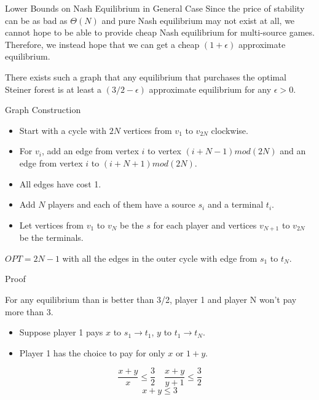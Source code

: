 \documentclass[11pt,aspectratio=169]{beamer}
\begin{document}
\begin{frame}{Lower Bounds on Nash Equilibrium in General Case}
    Since the price of stability can be as bad as $\Theta(N)$ and pure Nash equilibrium may not exist at all, we cannot hope to be able to provide cheap Nash equilibrium for multi-source games.\\
    Therefore, we instead hope that we can get a cheap $(1+\epsilon)$ approximate equilibrium.\\
    \begin{theorem}
        There exists such a graph that any equilibrium that purchases the optimal Steiner forest is at least a $(3/2-\epsilon)$ approximate equilibrium for any $\epsilon > 0$.
    \end{theorem}
\end{frame}

\begin{frame}{Graph Construction }

    \begin{itemize}
        \item Start with a cycle with $2N$ vertices from $v_1 \text{ to } v_{2N}$ clockwise. 
        \item For $v_i$, add an edge from vertex $i$ to vertex $(i+N-1)mod (2N)$ and an edge from vertex $i$ to $(i+N+1)mod (2N)$.
        \item All edges have cost 1. 
        \item Add $N$ players and each of them have a source $s_i$ and a terminal $t_i$. 
        \item Let vertices from $v_1$ to $v_N$ be the $s$ for each player and vertices $v_{N+1}$ to $v_{2N}$ be the terminals.
    \end{itemize}
    $OPT = 2N-1$ with all the edges in the outer cycle with edge from $s_1$ to $t_N$. 
\end{frame}

\begin{frame}{Proof}
   
    \begin{lemma}
        For any equilibrium than is better than 3/2, player 1 and player N won't pay more than 3. 
    \end{lemma}
    \begin{itemize}
        \item Suppose player 1 pays $x$ to $s_1 \rightarrow t_1$, $y$ to $t_1 \rightarrow t_N$. 
        \item Player 1 has the choice to pay for only $x$ or $1+y$. 
    \end{itemize}
    \vspace{10pt}
    \[\frac{x+y}{x} \leq \frac{3}{2}\quad\frac{x+y}{y+1} \leq \frac{3}{2}\]
     \[x+y\leq 3\]    
\end{frame}
\end{document}
